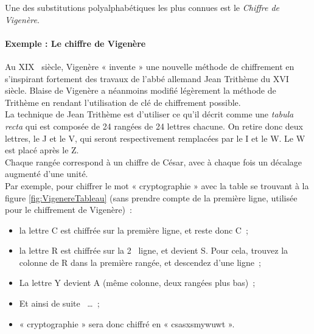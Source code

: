 Une des substitutions polyalphabétiques les plus connues est le
\emph{Chiffre de Vigenère}.

\paragraph{Exemple : Le chiffre de Vigenère\label{syst:ChiffreVigenere}}
Au XIX\ieme~ siècle, Vigenère « invente » une nouvelle méthode de
chiffrement en s'inspirant fortement des travaux de l'abbé allemand
Jean Trithème du XVI\ieme~ siècle. Blaise de Vigenère a néanmoins
modifié légèrement la méthode de Trithème en rendant l'utilisation de
clé de chiffrement possible.\\

La technique de Jean Trithème est d'utiliser ce qu'il décrit comme une
\emph{tabula recta} qui est composée de 24 rangées de 24
lettres chacune. On retire donc deux lettres, le J et le V, qui seront
respectivement remplacées par le I et le W. Le W est placé après le
Z.\\
Chaque rangée correspond à un chiffre de César,
avec à chaque fois un décalage augmenté d'une unité. \\

Par exemple, pour chiffrer le mot « cryptographie » avec la table se
trouvant à la figure \ref{fig:VigenereTableau} (sans prendre
compte de la première ligne, utilisée pour le chiffrement de
Vigenère)~: 
\begin{itemize}
  \item la lettre C est chiffrée sur la première ligne, et reste
    donc C~;
  \item la lettre R est chiffrée sur la 2\ieme~ ligne, et devient
    S. Pour cela, trouvez la colonne de R dans la première rangée, et
    descendez d'une ligne~;
  \item La lettre Y devient A (même colonne, deux rangées plus bas)~;
  \item Et ainsi de suite ~\dots~;
  \item « cryptographie » sera donc chiffré en « csasxsmywuwt ».
\end{itemize}


